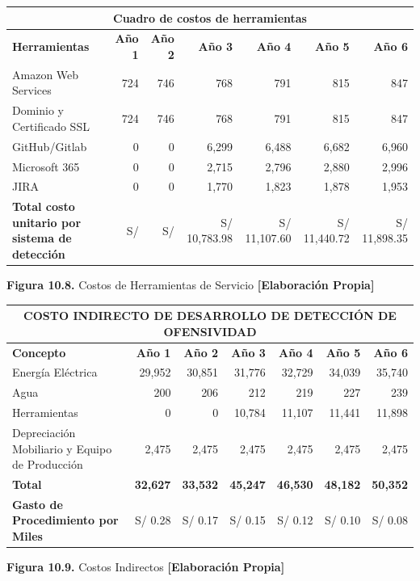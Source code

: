 \begin{table}[H]
\centering
\scriptsize
\renewcommand{\arraystretch}{1.15}
\setlength{\tabcolsep}{5pt}
\begin{tabular}{|l|r|r|r|r|r|r|}
\hline
\multicolumn{7}{|c|}{\textbf{Cuadro de costos de herramientas}} \\ \hline
\textbf{Herramientas} & \textbf{Año 1} & \textbf{Año 2} & \textbf{Año 3} & \textbf{Año 4} & \textbf{Año 5} & \textbf{Año 6} \\ \hline
Amazon Web Services & 724 & 746 & 768 & 791 & 815 & 847 \\ \hline
Dominio y Certificado SSL & 724 & 746 & 768 & 791 & 815 & 847 \\ \hline
GitHub/Gitlab & 0 & 0 & 6,299 & 6,488 & 6,682 & 6,960 \\ \hline
Microsoft 365 & 0 & 0 & 2,715 & 2,796 & 2,880 & 2,996 \\ \hline
JIRA & 0 & 0 & 1,770 & 1,823 & 1,878 & 1,953 \\ \hline
\textbf{Total costo unitario por sistema de detección} & S/ & S/ & S/ 10,783.98 & S/ 11,107.60 & S/ 11,440.72 & S/ 11,898.35 \\ \hline
\end{tabular}

\vspace{0.2cm}
\textbf{Figura 10.8.} Costos de Herramientas de Servicio \textbf{[Elaboración Propia]}
\end{table}

\begin{table}[H]
\centering
\scriptsize
\renewcommand{\arraystretch}{1.15}
\setlength{\tabcolsep}{5pt}
\begin{tabular}{|l|r|r|r|r|r|r|}
\hline
\multicolumn{7}{|c|}{\textbf{COSTO INDIRECTO DE DESARROLLO DE DETECCIÓN DE OFENSIVIDAD}} \\ \hline
\textbf{Concepto} & \textbf{Año 1} & \textbf{Año 2} & \textbf{Año 3} & \textbf{Año 4} & \textbf{Año 5} & \textbf{Año 6} \\ \hline
Energía Eléctrica & 29,952 & 30,851 & 31,776 & 32,729 & 34,039 & 35,740 \\ \hline
Agua & 200 & 206 & 212 & 219 & 227 & 239 \\ \hline
Herramientas & 0 & 0 & 10,784 & 11,107 & 11,441 & 11,898 \\ \hline
Depreciación Mobiliario y Equipo de Producción & 2,475 & 2,475 & 2,475 & 2,475 & 2,475 & 2,475 \\ \hline
\textbf{Total} & \textbf{32,627} & \textbf{33,532} & \textbf{45,247} & \textbf{46,530} & \textbf{48,182} & \textbf{50,352} \\ \hline
\textbf{Gasto de Procedimiento por Miles} & S/ 0.28 & S/ 0.17 & S/ 0.15 & S/ 0.12 & S/ 0.10 & S/ 0.08 \\ \hline
\end{tabular}

\vspace{0.2cm}
\textbf{Figura 10.9.} Costos Indirectos \textbf{[Elaboración Propia]}
\end{table}

